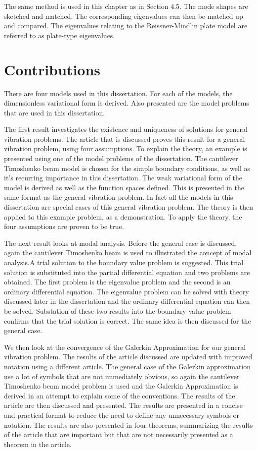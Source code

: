 \documentclass[../main.tex]{subfiles}
\begin{document}
The same method is used in this chapter as in Section 4.5. The mode shapes are sketched and matched. The corresponding eigenvalues can then be matched up and compared. The eigenvalues relating to the Reissner-Mindlin plate model are referred to as plate-type eigenvalues.

\section{Contributions}

There are four models used in this dissertation. For each of the models, the dimensionless variational form is derived. Also presented are the model problems that are used in this dissertation.

The first result investigates the existence and uniqueness of solutions for general vibration problems. The article that is discussed proves this result for a general vibration problem, using four assumptions. To explain the theory, an example is presented using one of the model problems of the dissertation. The cantilever Timoshenko beam model is chosen for the simple boundary conditions, as well as it's recurring importance in this dissertation. The weak variational form of the model is derived as well as the function spaces defined. This is presented in the same format as the general vibration problem. In fact all the models in this dissertation are special cases of this general vibration problem. The theory is then applied to this example problem, as a demonstration. To apply the theory, the four assumptions are proven to be true.

The next result looks at modal analysis. Before the general case is discussed, again the cantilever Timoshenko beam is used to illustrated the concept of modal analysis.A trial solution to the boundary value problem is suggested. This trial solution is substituted into the partial differential equation and two problems are obtained. The first problem is the eigenvalue problem and the second is an ordinary differential equation. The eigenvalue problem can be solved with theory discussed later in the dissertation and the ordinary differential equation can then be solved. Substation of these two results into the boundary value problem confirms that the trial solution is correct. The same idea is then discussed for the general case.

We then look at the convergence of the Galerkin Approximation for our general vibration problem. The results of the article discussed are updated with improved notation using a different article. The general case of the Galerkin approximation use a lot of symbols that are not immediately obvious, so again the cantilever Timoshenko beam model problem is used and the Galerkin Approximation is derived in an attempt to explain some of the conventions. The results of the article are then discussed and presented. The results are presented in a concise and practical format to reduce the need to define any unnecessary symbols or notation. The results are also presented in four theorems, summarizing the results of the article that are important but that are not necessarily presented as a theorem in the article.
\end{document}
